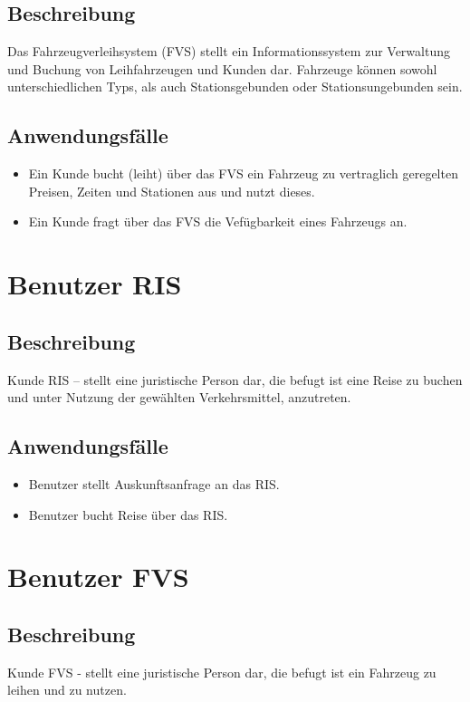\subsection{Beschreibung}
Das Fahrzeugverleihsystem (FVS) stellt ein Informationssystem zur Verwaltung und Buchung von Leihfahrzeugen und Kunden dar. Fahrzeuge können sowohl unterschiedlichen Typs, als auch Stationsgebunden oder Stationsungebunden sein.

\subsection{Anwendungsfälle}
\begin{itemize}
\item Ein Kunde bucht (leiht) über das FVS ein Fahrzeug zu vertraglich geregelten Preisen, Zeiten und Stationen aus und nutzt dieses.
\item Ein Kunde fragt über das FVS die Vefügbarkeit eines Fahrzeugs an. 
\end{itemize}

\section{Benutzer RIS}

\subsection{Beschreibung}
Kunde RIS – stellt eine juristische Person dar, die befugt ist eine Reise zu buchen und unter Nutzung der gewählten Verkehrsmittel, anzutreten. 

\subsection{Anwendungsfälle}
\begin{itemize}
\item Benutzer stellt Auskunftsanfrage an das RIS.
\item Benutzer bucht Reise über das RIS.
\end{itemize}

\section{Benutzer FVS}

\subsection{Beschreibung}
Kunde FVS  - stellt eine juristische Person dar, die befugt ist ein Fahrzeug zu leihen und zu nutzen.

